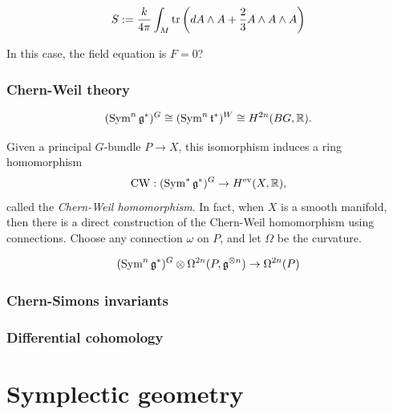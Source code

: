 \documentclass{../../large}
\begin{document}
\[S:=\frac k{4\pi}\int_M\operatorname{tr}\left(dA\wedge A+\frac23A\wedge A\wedge A\right)\]

In this case, the field equation is $F=0$?




\section{Chern-Weil theory}


\[(\operatorname{Sym}^n\mathfrak{g}^*)^G\cong(\operatorname{Sym}^n\mathfrak{t}^*)^W\cong H^{2n}(BG,\mathbb{R}).\]

Given a principal $G$-bundle $P\to X$, this isomorphism induces a ring homomorphism
\[\mathrm{CW}:(\operatorname{Sym}^*\mathfrak{g}^*)^G\to H^{\mathrm{ev}}(X,\mathbb{R}),\]
called the \emph{Chern-Weil homomorphism}.
In fact, when $X$ is a smooth manifold, then there is a direct construction of the Chern-Weil homomorphism using connections.
Choose any connection $\omega$ on $P$, and let $\Omega$ be the curvature.



\[(\operatorname{Sym}^n\mathfrak{g}^*)^G\otimes\Omega^{2n}(P,\mathfrak{g}^{\otimes n})\to\Omega^{2n}(P)\]

\section{Chern-Simons invariants}


\section{Differential cohomology}

\chapter{}
\chapter{}




\part{Symplectic geometry}
\chapter{}
\chapter{}
\chapter{}
\end{document}
